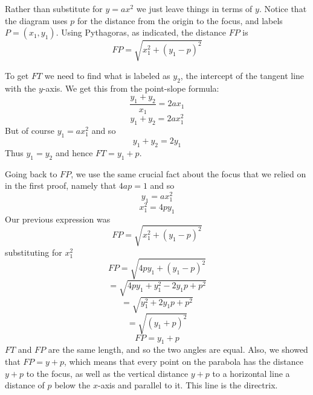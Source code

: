 \documentclass[11pt, oneside]{article}
\begin{document}
Rather than substitute for $y = ax^2$ we just leave things in terms of $y$.  Notice that the diagram uses $p$ for the distance from the origin to the focus, and labels $P = (x_1,y_1)$.  Using Pythagoras, as indicated, the distance $FP$ is 
\[ FP = \sqrt{x_1^2 + (y_1-p)^2} \]

To get $FT$ we need to find what is labeled as $y_2$, the intercept of the tangent line with the $y$-axis.  We get this from the point-slope formula:
\[ \frac{y_1 + y_2}{x_1} = 2ax_1 \]
\[ y_1 + y_2 = 2ax_1^2 \]
But of course $y_1 = ax_1^2$ and so
\[ y_1 + y_2 = 2y_1 \]
Thus $y_1 = y_2$ and hence $FT = y_1 + p$.

Going back to $FP$, we use the same crucial fact about the focus that we relied on in the first proof, namely that $4ap = 1$ and so
\[ y_1 = ax_1^2 \]
\[ x_1^2 = 4p y_1 \]
Our previous expression was
\[ FP = \sqrt{x_1^2 + (y_1-p)^2} \]
substituting for $x_1^2$
\[ FP = \sqrt{4py_1 + (y_1-p)^2} \]
\[ = \sqrt{4py_1 + y_1^2 - 2y_1p +  p^2} \]
\[ = \sqrt{y_1^2 + 2y_1p +  p^2} \]
\[ = \sqrt{(y_1 + p)^2} \]
\[ FP = y_1 + p \]
$FT$ and $FP$ are the same length, and so the two angles are equal.  Also, we showed that $FP = y + p$, which means that every point on the parabola has the distance $y + p$ to the focus, as well as the vertical distance $y + p$ to a horizontal line a distance of $p$ below the $x$-axis and parallel to it.  This line is the directrix.
\end{document}
